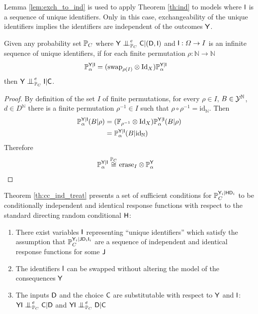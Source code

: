 Lemma \ref{lem:exch_to_ind} is used to apply Theorem \ref{th:ind} to models where $\mathsf{I}$ is a sequence of unique identifiers. Only in this case, exchangeability of the unique identifiers implies the identifiers are independent of the outcomes $\mathsf{Y}$.

\begin{lemma}\label{lem:exch_to_ind}
Given any probability set $\mathbb{P}_C$ where $\RV{Y}\CI_{\prob{P}_C}^e \RV{C}|(\RV{D},\RV{I})$ and $\mathsf{I}:\Omega\to I$ is an infinite sequence of unique identifiers, if for each finite permutation $\rho:\mathbb{N}\to \mathbb{N}$
\begin{align}
    \mathbb{P}_\alpha^{\mathsf{Y}|\mathsf{I}} &= (\text{swap}_{\rho(I)}\otimes \text{Id}_X )\mathbb{P}_\alpha^{\mathsf{Y}|\mathsf{I}}
\end{align}
then $\RV{Y}\CI_{\prob{P}_C}^e \RV{I}|\RV{C}$.
\end{lemma}

\begin{proof}
By definition of the set $I$ of finite permutations, for every $\rho\in I$, $B\in\mathcal{Y}^{\mathbb{N}}$, $d\in D^{\mathbb{N}}$ there is a finite permutation $\rho^{-1}\in I$ such that $\rho\circ\rho^{-1}=\text{id}_{\mathbb{N}}$. Then
\begin{align}
    \mathbb{P}_\alpha^{\mathsf{Y}|\mathsf{I}}(B|\rho) &= (\mathbb{F}_{\rho^{-1}}\otimes \text{Id}_X )\mathbb{P}_\alpha^{\mathsf{Y}|\mathsf{I}}(B|\rho)\\
    &= \mathbb{P}_\alpha^{\mathsf{Y}|\mathsf{I}}(B|\text{id}_{\mathbb{N}})
\end{align}
Therefore
\begin{align}
    \mathbb{P}_\alpha^{\mathsf{Y}|\mathsf{I}} &\overset{\mathbb{P}_C}{\cong} \text{erase}_{I}\otimes \mathbb{P}_\alpha^{\mathsf{Y}}
\end{align}
\end{proof}

Theorem \ref{th:cc_ind_treat} presents a set of sufficient conditions for $\mathbb{P}_C^{\mathsf{Y}_i|\mathsf{H}\mathsf{D}_i}$ to be conditionally independent and identical response functions with respect to the standard directing random conditional $\mathsf{H}$:
\begin{enumerate}
    \item There exist variables $\mathsf{I}$ representing ``unique identifiers'' which satisfy the assumption that $\mathbb{P}_C^{\mathsf{Y}_i|\mathsf{J}\mathsf{D}_i\mathsf{I}_i}$ are a sequence of independent and identical response functions for some $\mathsf{J}$
    \item The identifiers $\mathsf{I}$ can be swapped without altering the model of the consequences $\mathsf{Y}$
    \item The inputs $\mathsf{D}$ and the choice $\mathsf{C}$ are substitutable with respect to $\mathsf{Y}$ and $\mathsf{I}$: $\RV{YI}\CI^e_{\prob{P}_C} \RV{C}|\RV{D}$ and $\RV{YI}\CI^e_{\prob{P}_C} \RV{D}|\RV{C}$
\end{enumerate}

